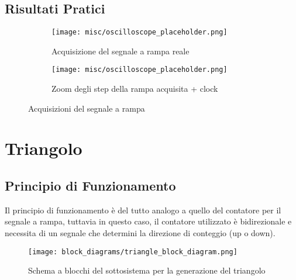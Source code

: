
\subsection*{Risultati Pratici}

\begin{figure}[ht]
    \centering

    \begin{subfigure}{.5\textwidth}
        \centering
        \texttt{[image: misc/oscilloscope\_placeholder.png]}
        \caption{Acquisizione del segnale a rampa reale}
        \label{acq_ramp}
    \end{subfigure}%
    \begin{subfigure}{.5\textwidth}
        \centering
        \texttt{[image: misc/oscilloscope\_placeholder.png]}
        \caption{Zoom degli step della rampa acquisita + clock}
        \label{acq_ramp_steps}
    \end{subfigure}

    \caption{Acquisizioni del segnale a rampa}
    \label{acq_ramp_signals}
\end{figure}


\section{Triangolo}


\subsection*{Principio di Funzionamento}


Il principio di funzionamento è del tutto analogo a quello del contatore per il segnale a
rampa, tuttavia in questo caso, il contatore utilizzato è bidirezionale e necessita di un
segnale che determini la direzione di conteggio (up o down).
\medskip

\begin{figure}[ht]
    \centering
    \texttt{[image: block\_diagrams/triangle\_block\_diagram.png]}
    \caption{Schema a blocchi del sottosistema per la generazione del triangolo}
    \label{triangle_block_diagram}
\end{figure}

